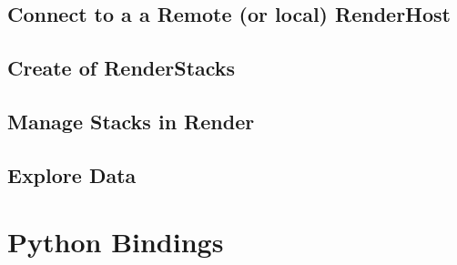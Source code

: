 \subsection{Connect to a a Remote (or local) RenderHost}

\subsection{Create of RenderStacks}

\subsection{Manage Stacks in Render}

\subsection{Explore Data}

\section{Python Bindings}